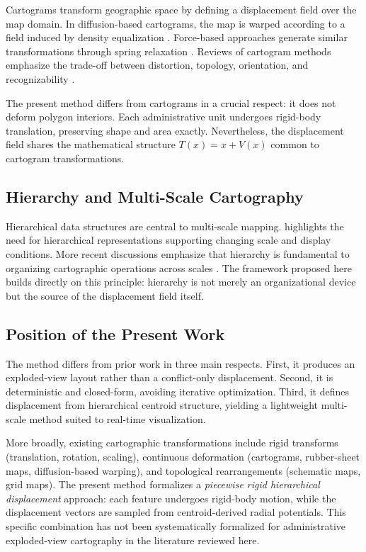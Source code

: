 \documentclass[12pt, a4paper]{article}
\numberwithin{equation}{section}
\begin{document}
Cartograms transform geographic space by defining a displacement field over the map domain. In diffusion-based cartograms, the map is warped according to a field induced by density equalization \citep{gastner2004}. Force-based approaches generate similar transformations through spring relaxation \citep{sun2020}. Reviews of cartogram methods emphasize the trade-off between distortion, topology, orientation, and recognizability \citep{nusrat2016}.

The present method differs from cartograms in a crucial respect: it does not deform polygon interiors. Each administrative unit undergoes rigid-body translation, preserving shape and area exactly. Nevertheless, the displacement field shares the mathematical structure $T(x) = x + V(x)$ common to cartogram transformations.

\subsection{Hierarchy and Multi-Scale Cartography}

Hierarchical data structures are central to multi-scale mapping. \citet{cecconi2003} highlights the need for hierarchical representations supporting changing scale and display conditions. More recent discussions emphasize that hierarchy is fundamental to organizing cartographic operations across scales \citep{bundy2020, yan2019}. The framework proposed here builds directly on this principle: hierarchy is not merely an organizational device but the source of the displacement field itself.

\subsection{Position of the Present Work}

The method differs from prior work in three main respects. First, it produces an exploded-view layout rather than a conflict-only displacement. Second, it is deterministic and closed-form, avoiding iterative optimization. Third, it defines displacement from hierarchical centroid structure, yielding a lightweight multi-scale method suited to real-time visualization.

More broadly, existing cartographic transformations include rigid transforms (translation, rotation, scaling), continuous deformation (cartograms, rubber-sheet maps, diffusion-based warping), and topological rearrangements (schematic maps, grid maps). The present method formalizes a \emph{piecewise rigid hierarchical displacement} approach: each feature undergoes rigid-body motion, while the displacement vectors are sampled from centroid-derived radial potentials. This specific combination has not been systematically formalized for administrative exploded-view cartography in the literature reviewed here.
\end{document}
